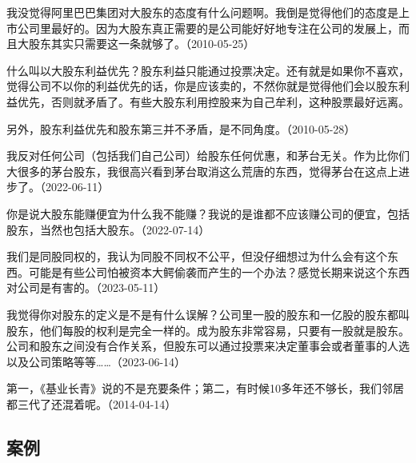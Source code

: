 我没觉得阿里巴巴集团对大股东的态度有什么问题啊。我倒是觉得他们的态度是上市公司里最好的。因为大股东真正需要的是公司能好好地专注在公司的发展上，而且大股东其实只需要这一条就够了。（2010-05-25）


什么叫以大股东利益优先？股东利益只能通过投票决定。还有就是如果你不喜欢，觉得公司不以你的利益优先的话，你是应该卖的，不然你就是觉得他们会以股东利益优先，否则就矛盾了。有些大股东利用控股来为自己牟利，这种股票最好远离。

另外，股东利益优先和股东第三并不矛盾，是不同角度。（2010-05-28）

我反对任何公司（包括我们自己公司）给股东任何优惠，和茅台无关。作为比你们大很多的茅台股东，我很高兴看到茅台取消这么荒唐的东西，觉得茅台在这点上进步了。（2022-06-11）


你是说大股东能赚便宜为什么我不能赚？我说的是谁都不应该赚公司的便宜，包括股东，当然也包括大股东。（2022-07-14）


我们是同股同权的，我认为同股不同权不公平，但没仔细想过为什么会有这个东西。可能是有些公司怕被资本大鳄偷袭而产生的一个办法？感觉长期来说这个东西对公司是有害的。（2023-05-11）


我觉得你对股东的定义是不是有什么误解？公司里一股的股东和一亿股的股东都叫股东，他们每股的权利是完全一样的。成为股东非常容易，只要有一股就是股东。公司和股东之间没有合作关系，但股东可以通过投票来决定董事会或者董事的人选以及公司策略等等……（2023-06-14）


第一，《基业长青》说的不是充要条件；第二，有时候10多年还不够长，我们邻居都三代了还混着呢。（2014-04-14）

\subsection{案例}

